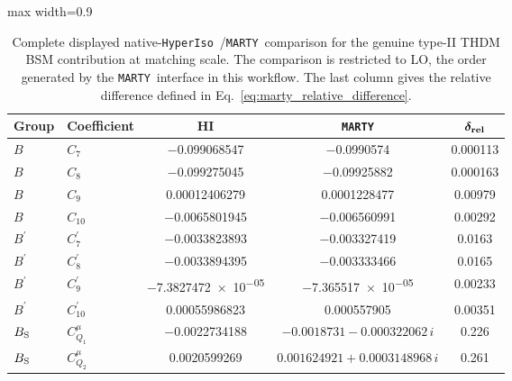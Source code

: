 \documentclass[preprint,11pt]{elsarticle}
\newcommand{\hi}{\texttt{HyperIso}}
\newcommand{\mty}{\texttt{MARTY}}
\begin{document}
\begin{table}[!ht]
\centering
\small
\setlength{\tabcolsep}{4pt}
\renewcommand{\arraystretch}{1.08}
\begin{adjustbox}{max width=0.9\textwidth}
\begin{tabular}{llccc}
\hline
\textbf{Group} & \textbf{Coefficient} & \textbf{HI} & \textbf{\mty} & \(\boldsymbol{\delta_{\rm rel}}\) \\
\hline
\(B\) & \(C_{7}\) & \num{-0.099068547} & \num{-0.0990574} & \num{0.000113} \\
\(B\) & \(C_{8}\) & \num{-0.099275045} & \num{-0.09925882} & \num{0.000163} \\
\(B\) & \(C_{9}\) & \num{0.00012406279} & \num{0.0001228477} & \num{0.00979} \\
\(B\) & \(C_{10}\) & \num{-0.0065801945} & \num{-0.006560991} & \num{0.00292} \\
\(B^\prime\) & \(C^\prime_{7}\) & \num{-0.0033823893} & \num{-0.003327419} & \num{0.0163} \\
\(B^\prime\) & \(C^\prime_{8}\) & \num{-0.0033894395} & \num{-0.003333466} & \num{0.0165} \\
\(B^\prime\) & \(C^\prime_{9}\) & \num{-7.3827472e-05} & \num{-7.365517e-05} & \num{0.00233} \\
\(B^\prime\) & \(C^\prime_{10}\) & \num{0.00055986823} & \num{0.000557905} & \num{0.00351} \\
\(B_{\rm S}\) & \(C_{Q_1}^{\mu}\) & \num{-0.0022734188} & \(\num{-0.0018731}-\num{0.000322062}\,i\) & \num{0.226} \\
\(B_{\rm S}\) & \(C_{Q_2}^{\mu}\) & \num{0.0020599269} & \(\num{0.001624921}+\num{0.0003148968}\,i\) & \num{0.261} \\
\hline
\end{tabular}
\end{adjustbox}
\caption{Complete displayed native-\hi~/\mty~comparison for the genuine type-II THDM BSM contribution at matching scale.  The comparison is restricted to LO, the order generated by the \mty~interface in this workflow.  The last column gives the relative difference defined in Eq.~\ref{eq:marty_relative_difference}.}
\label{tab:comparison_marty_full_bsm}
\end{table}
\end{document}
